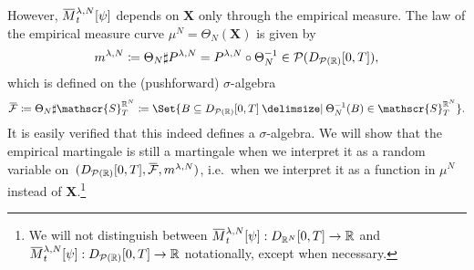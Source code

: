 However, \(\ol{M}_t^{\lambda,N}[\psi]\) depends on \( \bm{X} \) only through the empirical measure.
The law of the empirical measure curve \(\mu^N = \Theta_N(\bm{X})\) is given by
\begin{equation}
  m^{\lambda,N} \coloneqq \Theta_N \sharp P^{\lambda, N} = P^{\lambda, N} \circ \Theta_N^{-1} \in \mathcal{P}(D_{\mathcal{P}(\mathbb{R})}[0,T]),
\end{equation}
which is defined on the (pushforward) \( \sigma \)-algebra
\begin{equation}
  \ol{\cF} \coloneqq \Theta_N \sharp \mathscr{S}_T^{\potspace^N} \coloneqq \Set{B \subseteq D_{\cP(\potspace)}[0,T] \given \Theta_N^{-1}(B) \in \mathscr{S}_T^{\potspace^N}}.
\end{equation}
It is easily verified that this indeed defines a \( \sigma \)-algebra.
We will show that the empirical martingale is still a martingale when we interpret it as a random variable on~\((D_{\cP(\potspace)}[0,T], \ol{\cF}, \lawmu^{\lambda,N})\), i.e.\ when we interpret it as a function in \(\mu^N\) instead of \(\bm{X}\).\footnote{We will not distinguish between \( \ol{M}_t^{\lambda,N}[\psi] :  D_{\potspace^N}[0,T] \to \bR \) and \( \ol{M}_t^{\lambda,N}[\psi] :  D_{\cP(\potspace)}[0,T] \to \bR \) notationally, except when necessary.}

